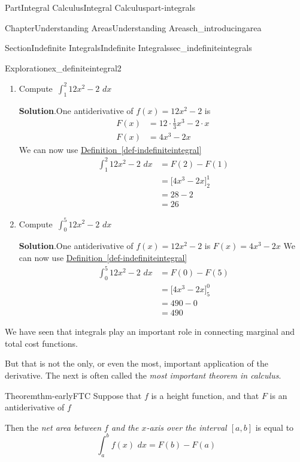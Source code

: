 \documentclass[oneside,10pt,]{tufte-book}
\newcommand{\blocktitlefont}{\relax}
\newcommand{\xreffont}{\relax}
\numberwithin{equation}{chapter}
\newcommand{\intdx}[1]{{\,\int#1\,\,dx}}
\newcommand{\amp}{&}
\begin{document}
\begin{partptx}{Part}{Integral Calculus}{}{Integral Calculus}{}{}{part-integrals}
\begin{chapterptx}{Chapter}{Understanding Areas}{}{Understanding Areas}{}{}{ch_introducingarea}
\begin{sectionptx}{Section}{Indefinite Integrals}{}{Indefinite Integrals}{}{}{sec_indefiniteintegrals}
\begin{exploration}{Exploration}{}{ex_definiteintegral2}
\begin{enumerate}[font=\bfseries,label=(\alph*),ref=\alph*]
\item{}Compute \(\intdx{_1^2 12x^2 - 2} \)%
\par\smallskip%
\noindent\textbf{\blocktitlefont Solution}.\hypertarget{ex_definiteintegral2-1-2}{}\quad{}One antiderivative of \(f(x) = 12x^2 - 2 \) is%
\begin{align*}
F(x) \amp = 12\cdot\frac{1}{3}x^3 - 2\cdot x\\
F(x) \amp = 4x^3 - 2x
\end{align*}
We can now use \hyperref[def-indefiniteintegral]{Definition~{\xreffont\ref{def-indefiniteintegral}}}%
\begin{align*}
\intdx{_1^2 12x^2 - 2}  \amp = F(2) - F(1) \\
\amp = \Big[ 4x^3 - 2x \Big]_2^1\\
\amp = 28-2 \\
\amp = 26 
\end{align*}
%
\item{}Compute \(\intdx{_0^5 12x^2 - 2} \)%
\par\smallskip%
\noindent\textbf{\blocktitlefont Solution}.\hypertarget{ex_definiteintegral2-2-2}{}\quad{}One antiderivative of \(f(x) = 12x^2 - 2 \) is \(F(x)= 4x^3 - 2x \) We can now use \hyperref[def-indefiniteintegral]{Definition~{\xreffont\ref{def-indefiniteintegral}}}%
\begin{align*}
\intdx{_0^5 12x^2 - 2}  \amp = F(0) - F(5) \\
\amp = \Big[ 4x^3 - 2x \Big]_5^0\\
\amp = 490-0 \\
\amp = 490 
\end{align*}
%
\end{enumerate}%
\end{exploration}%
We have seen that integrals play an important role in connecting marginal and total cost functions.%
\par
But that  is not the only, or even the most, important application of the derivative.  The next is often called the \emph{most important theorem in calculus}.%
\begin{theorem}{Theorem}{}{}{thm-earlyFTC}%
Suppose that \(f\) is a height function, and that \(F\) is an antiderivative of \(f\)%
\par
Then the \emph{net area between \(f\) and the \(x\)-axis over the interval \([a,b]\)} is equal to%
\begin{equation*}
\intdx{_a^b f(x) } = F(b) - F(a) 
\end{equation*}
%
\end{theorem}

\end{sectionptx}
\end{chapterptx}
\end{partptx}
\end{document}

